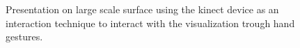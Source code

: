 \documentclass[journal]{vgtc}                %
\begin{document}
\begin{figure}[htb]
	\centering
	\caption{Presentation on large scale surface using the kinect device as an interaction technique to interact with the visualization trough hand gestures.}
	\label{img:dome_clip}
\end{figure}

\end{document}

